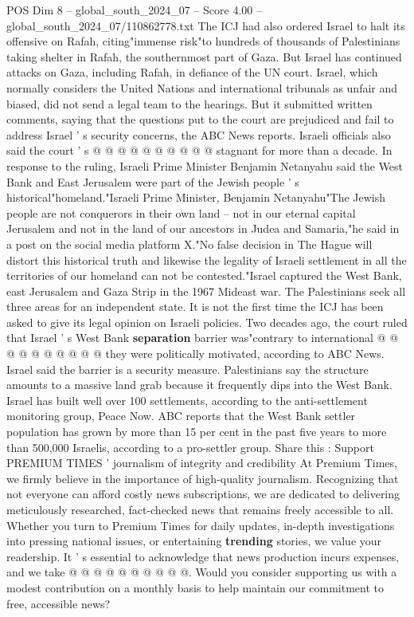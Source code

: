 \begin{textsample}{POS Dim 8 – global\_south\_2024\_07 – Score 4.00 – global\_south\_2024\_07/110862778.txt}
The ICJ had also ordered Israel to halt its offensive on Rafah, citing"immense risk"to hundreds of thousands of Palestinians taking shelter in Rafah, the southernmost part of Gaza.
But Israel has continued attacks on Gaza, including Rafah, in defiance of the UN court.
Israel, which normally considers the United Nations and international tribunals as unfair and biased, did not send a legal team to the hearings.
But it submitted written comments, saying that the questions put to the court are prejudiced and fail to address Israel ' s security concerns, the ABC News reports.
Israeli officials also said the court ' s @ @ @ @ @ @ @ @ @ @ stagnant for more than a decade.
In response to the ruling, Israeli Prime Minister Benjamin Netanyahu said the West Bank and East Jerusalem were part of the Jewish people ' s historical"homeland."Israeli Prime Minister, Benjamin Netanyahu"The Jewish people are not conquerors in their own land -- not in our eternal capital Jerusalem and not in the land of our ancestors in Judea and Samaria,"he said in a post on the social media platform X."No false decision in The Hague will distort this historical truth and likewise the legality of Israeli settlement in all the territories of our homeland can not be contested."Israel captured the West Bank, east Jerusalem and Gaza Strip in the 1967 Mideast war.
The Palestinians seek all three areas for an independent state.
It is not the first time the ICJ has been asked to give its legal opinion on Israeli policies.
Two decades ago, the court ruled that Israel ' s West Bank \textbf{separation} barrier was"contrary to international @ @ @ @ @ @ @ @ @ @ they were politically motivated, according to ABC News.
Israel said the barrier is a security measure.
Palestinians say the structure amounts to a massive land grab because it frequently dips into the West Bank.
Israel has built well over 100 settlements, according to the anti-settlement monitoring group, Peace Now.
ABC reports that the West Bank settler population has grown by more than 15 per cent in the past five years to more than 500,000 Israelis, according to a pro-settler group.
Share this : Support PREMIUM TIMES ' journalism of integrity and credibility At Premium Times, we firmly believe in the importance of high-quality journalism.
Recognizing that not everyone can afford costly news subscriptions, we are dedicated to delivering meticulously researched, fact-checked news that remains freely accessible to all.
Whether you turn to Premium Times for daily updates, in-depth investigations into pressing national issues, or entertaining \textbf{trending} stories, we value your readership.
It ' s essential to acknowledge that news production incurs expenses, and we take @ @ @ @ @ @ @ @ @ @.
Would you consider supporting us with a modest contribution on a monthly basis to help maintain our commitment to free, accessible news?

\end{textsample}
